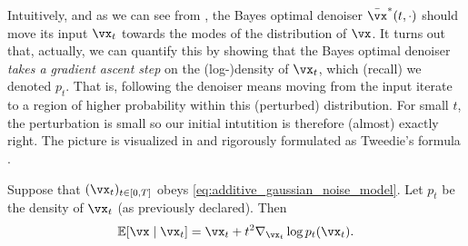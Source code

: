 \documentclass[../../book-main.tex]{subfiles}
\begin{document}
Intuitively, and as we can see from , the Bayes optimal denoiser \(\bar{\vx}^{\ast}(t, \cdot)\) should move its input \(\vx_{t}\) towards the modes of the distribution of \(\vx\). It turns out that, actually, we can quantify this by showing that the Bayes optimal denoiser \textit{takes a gradient ascent step} on the (log-)density of \(\vx_{t}\), which (recall) we denoted \(p_{t}\). That is, following the denoiser means moving from the input iterate to a region of higher probability within this (perturbed) distribution. For small \(t\), the perturbation is small so our initial intutition is therefore (almost) exactly right. The picture is visualized in  and rigorously formulated as Tweedie's formula \cite{Robbins1956AnEB}.
\begin{theorem}\label{thm:tweedie}
	Suppose that \((\vx_{t})_{t \in [0, T]}\) obeys \eqref{eq:additive_gaussian_noise_model}. Let \(p_{t}\) be the density of \(\vx_{t}\) (as previously declared). Then 
	\begin{equation}\label{eq:tweedie}
		\Ex[\vx \mid \vx_{t}] = \vx_{t} + t^{2}\nabla_{\vx_{t}} \log p_{t}(\vx_{t}).
	\end{equation}
\end{theorem}
\end{document}
